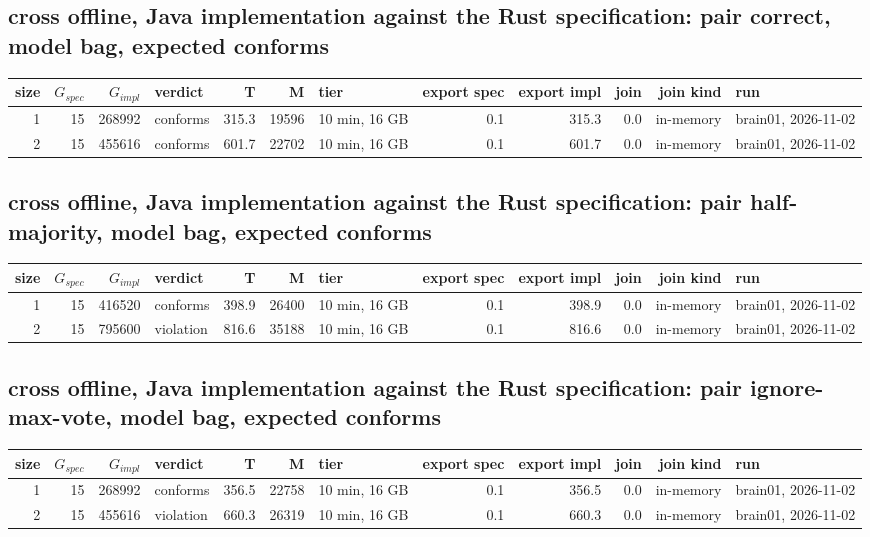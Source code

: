 \documentclass[10pt]{article}
\begin{document}
\subsection*{cross offline, Java implementation against the Rust specification: pair \textsf{correct}, model bag, expected conforms}
\begin{longtable}{@{}rrrlrrlrrrrl@{}}
\toprule
size & $G_{\mathit{spec}}$ & $G_{\mathit{impl}}$ & verdict & T & M & tier & export spec & export impl & join & join kind & run \\
\midrule
\endhead
\color{red} 1 & 15 & 268992 & conforms & 315.3 & 19596 & 10 min, 16 GB & 0.1 & 315.3 & 0.0 & in-memory & brain01, 2026-11-02 \\
\color{red} 2 & 15 & 455616 & conforms & 601.7 & 22702 & 10 min, 16 GB & 0.1 & 601.7 & 0.0 & in-memory & brain01, 2026-11-02 \\
\bottomrule
\end{longtable}
\subsection*{cross offline, Java implementation against the Rust specification: pair \textsf{half-majority}, model bag, expected conforms}
\begin{longtable}{@{}rrrlrrlrrrrl@{}}
\toprule
size & $G_{\mathit{spec}}$ & $G_{\mathit{impl}}$ & verdict & T & M & tier & export spec & export impl & join & join kind & run \\
\midrule
\endhead
\color{red} 1 & 15 & 416520 & conforms & 398.9 & 26400 & 10 min, 16 GB & 0.1 & 398.9 & 0.0 & in-memory & brain01, 2026-11-02 \\
\color{red} 2 & 15 & 795600 & violation & 816.6 & 35188 & 10 min, 16 GB & 0.1 & 816.6 & 0.0 & in-memory & brain01, 2026-11-02 \\
\bottomrule
\end{longtable}
\subsection*{cross offline, Java implementation against the Rust specification: pair \textsf{ignore-max-vote}, model bag, expected conforms}
\begin{longtable}{@{}rrrlrrlrrrrl@{}}
\toprule
size & $G_{\mathit{spec}}$ & $G_{\mathit{impl}}$ & verdict & T & M & tier & export spec & export impl & join & join kind & run \\
\midrule
\endhead
\color{red} 1 & 15 & 268992 & conforms & 356.5 & 22758 & 10 min, 16 GB & 0.1 & 356.5 & 0.0 & in-memory & brain01, 2026-11-02 \\
\color{red} 2 & 15 & 455616 & violation & 660.3 & 26319 & 10 min, 16 GB & 0.1 & 660.3 & 0.0 & in-memory & brain01, 2026-11-02 \\
\bottomrule
\end{longtable}
\end{document}
